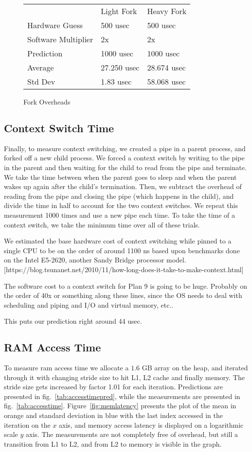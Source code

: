 \documentclass[letterpaper,twocolumn,10pt]{article}
\begin{document}
\begin{figure}
	\centering
\begin{tabular}{lll}
        & Light Fork & Heavy Fork \\
Hardware Guess & 500 usec & 500 usec \\
Software Multiplier & 2x & 2x \\
Prediction & 1000 usec & 1000 usec \\
Average & 27.250  usec & 28.674  usec \\
Std Dev & 1.83 usec & 58.068 usec                  
\end{tabular}
\caption{Fork Overheads}
\label{tab:forkoverheads}
\end{figure}

\subsection{Context Switch Time}

Finally, to measure context switching, we created a pipe in a parent process,
and forked off a new child process. We forced a context switch by writing to
the pipe in the parent and then waiting for the child to read from the pipe
and terminate. We take the time between when the parent goes to sleep and when
the parent wakes up again after the child's termination. Then, we subtract
the overhead of reading from the pipe and closing the pipe (which happens in
the child), and divide the time in half to account for the two context switches.
We repeat this measurement 1000 times and use a new pipe each time. To take
the time of a context switch, we take the minimum time over all of these trials.

We estimated the base hardware cost of context switching while pinned to a single CPU to
be on the order of around 1100 ns based upon benchmarks done on the Intel E5-2620, another
Sandy Bridge processor model. [https://blog.tsunanet.net/2010/11/how-long-does-it-take-to-make-context.html]

The software cost to a context switch for Plan 9 is going to be huge. Probably on the order of 40x or something along these lines, since the OS needs to deal with scheduling and piping and I/O and virtual memory, etc..

This puts our prediction right around 44 usec.

\subsection{RAM Access Time}
To measure ram access time we allocate a $1.6$ GB array on the heap, and iterated through it with changing stride size to hit L1, L2 cache and finally memory. The stride size gets increased by factor 1.01 for each iteration. Predictions are presented in fig.~\ref{tab:accesstimepred}, while the measurements are presented in fig.~\ref{tab:accesstime}. Figure~\ref{fig:memlatency} presents the plot of the mean in orange and standard deviation in blue with the last index accessed in the iteration on the $x$ axis, and memory access latency is displayed on a logarithmic scale $y$ axis. The measurements are not completely free of overhead, but still a transition from L1 to L2, and from L2 to memory is visible in the graph. 
\end{document}
